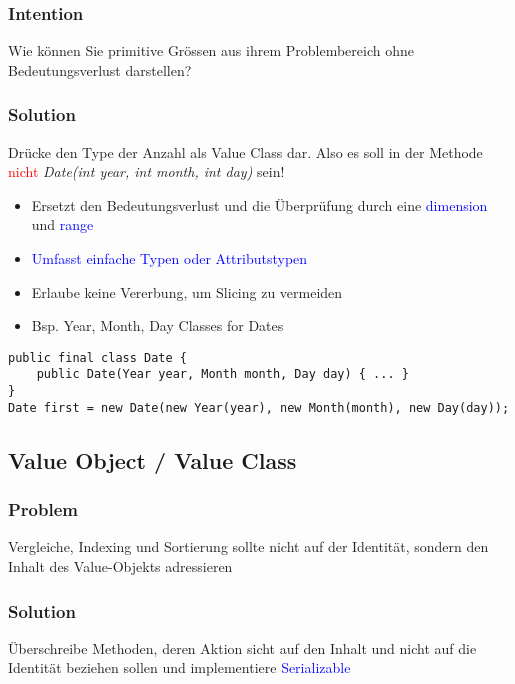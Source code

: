 \subsubsection{Intention}

Wie können Sie primitive Grössen aus ihrem Problembereich ohne Bedeutungsverlust darstellen?

\subsubsection{Solution}
Drücke den Type der Anzahl als Value Class dar. Also es soll in der Methode \textcolor{red}{nicht} \textit{Date(int year, int month, int day)} sein!\\

\begin{itemize}
    \item Ersetzt den Bedeutungsverlust und die Überprüfung durch eine \textcolor{blue}{dimension} und \textcolor{blue}{range}
    \item \textcolor{blue}{Umfasst einfache Typen oder Attributstypen}
    \item Erlaube keine Vererbung, um Slicing zu vermeiden
    \item Bsp. Year, Month, Day Classes for Dates
\end{itemize}
\begin{lstlisting}
public final class Date {
    public Date(Year year, Month month, Day day) { ... }
}
Date first = new Date(new Year(year), new Month(month), new Day(day));
\end{lstlisting}

\subsection{Value Object / Value Class}
\subsubsection{Problem}

Vergleiche, Indexing und Sortierung sollte nicht auf der Identität, sondern den Inhalt des Value-Objekts adressieren


\subsubsection{Solution}
Überschreibe Methoden, deren Aktion sicht auf den Inhalt und nicht auf die Identität beziehen sollen und implementiere \textcolor{blue}{Serializable}

